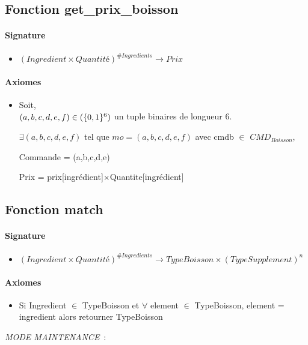 \documentclass[]{article}
\begin{document}
\subsection*{Fonction get\_prix\_boisson}
\paragraph{Signature}
\begin{itemize}
\item
  $  (Ingredient \times Quantité)^{\#Ingredients} \longrightarrow Prix$
\end{itemize}
\paragraph{Axiomes}
\begin{itemize}
\item
  Soit, \\ $(a,b,c,d,e,f) \in(\{0,1\}\textsuperscript{6})$ un tuple binaires de longueur 6.

$\exists (a,b,c,d,e,f)$ tel que $mo = (a,b,c,d,e,f)$ avec cmdb $\in$ $CMD_{Boisson}$,

Commande = (a,b,c,d,e)

Prix = prix{[}ingrédient{]}\(\times \)Quantite{[}ingrédient{]}
\end{itemize}

\subsection*{Fonction match}
\paragraph{Signature}
\begin{itemize}
\item
  $   (Ingredient \times Quantité)^{\#Ingredients}  \longrightarrow TypeBoisson \times (TypeSupplement)^{n}$
\end{itemize}
\paragraph{Axiomes}
\begin{itemize}
\item
 
Si Ingredient $\in$ TypeBoisson et $\forall$ element $\in$ TypeBoisson,
element = ingredient alors retourner TypeBoisson 
\end{itemize}

\emph{MODE MAINTENANCE}~:
\end{document}
